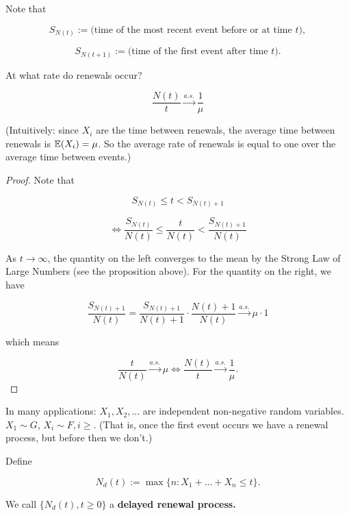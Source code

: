 \begin{remark} Note that

\[
S_{N(t)} := \text{(time of the most recent event before or at time } t) ,
\]

\[
S_{N(t+1)} :=  \text{(time of the first event after time } t) .
\]

\end{remark}

At what rate do renewals occur?

\begin{theorem}

\[
\frac{N(t)}{t} \xrightarrow{a.s.} \frac{1}{\mu}
\]

(Intuitively: since \(X_i\) are the time between renewals, the average time between renewals is \(\E(X_i) = \mu\). So the average rate of renewals is equal to one over the average time between events.) 

\end{theorem}

\begin{proof} Note that

\[
S_{N(t)} \leq t < S_{N(t) + 1}
\]

\[
\iff \frac{S_{N(t)}}{N(t)} \leq \frac{t}{N(t)} < \frac{S_{N(t) + 1}}{N(t)}
\]

As \(t \to \infty\), the quantity on the left converges to the mean by the Strong Law of Large Numbers (see the proposition above). For the quantity on the right, we have

\[
\frac{S_{N(t) + 1}}{N(t)} = \frac{S_{N(t) + 1}}{N(t)+ 1} \cdot \frac{N(t) + 1}{N(t)} \xrightarrow{a.s.} \mu \cdot 1
\]

which means

\[
 \frac{t}{N(t)} \xrightarrow{a.s.} \mu \iff \frac{N(t)}{t} \xrightarrow{a.s.} \frac{1}{\mu}.
\]
\end{proof}

\begin{remark}In many applications: \(X_1, X_2, \ldots\) are independent non-negative random variables. \(X_1 \sim G\), \(X_i \sim F, i \geq \). (That is, once the first event occurs we have a renewal process, but before then we don't.)

\end{remark}

\begin{definition}
Define

\[
N_d(t) := \max \{n: X_1 + \ldots + X_n \leq t \}.
\]

We call \(\{N_d(t), t \geq 0\}\) a \textbf{delayed renewal process.}

\end{definition}

